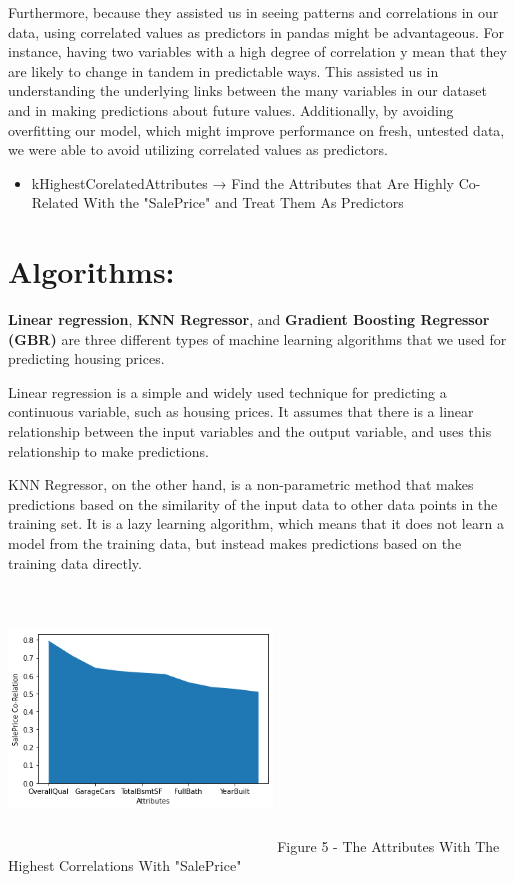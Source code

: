 \documentclass[10pt,twocolumn,letterpaper]{article}
\begin{document}
Furthermore, because they assisted us in seeing patterns and correlations in our data, using correlated values as predictors in pandas might be advantageous. For instance, having two variables with a high degree of correlation \textbf{}y mean that they are likely to change in tandem in predictable ways. This assisted us in understanding the underlying links between the many variables in our dataset and in making predictions about future values. Additionally, by avoiding overfitting our model, which might improve performance on fresh, untested data, we were able to avoid utilizing correlated values as predictors.

\begin{itemize}
    \item kHighestCorelatedAttributes → Find the Attributes that Are Highly Co-Related With the "SalePrice" and Treat Them As Predictors
\end{itemize}



\section{Algorithms:}
\textbf{Linear regression}, \textbf{KNN Regressor}, and \textbf{Gradient Boosting Regressor (GBR)} are three different types of machine learning algorithms that we used for predicting housing prices.

Linear regression is a simple and widely used technique for predicting a continuous variable, such as housing prices. It assumes that there is a linear relationship between the input variables and the output variable, and uses this relationship to make predictions.

KNN Regressor, on the other hand, is a non-parametric method that makes predictions based on the similarity of the input data to other data points in the training set. It is a lazy learning algorithm, which means that it does not learn a model from the training data, but instead makes predictions based on the training data directly.

\includegraphics[width=7cm,height=7cm]{img1.png}
Figure 5 - The Attributes With The Highest Correlations With "SalePrice"
\end{document}
